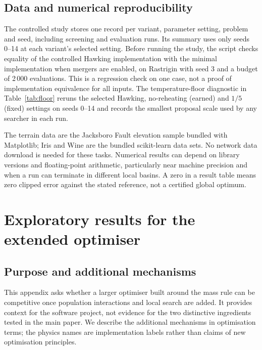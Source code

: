 \documentclass[10pt,a4paper]{article}
\begin{document}
\subsection{Data and numerical reproducibility}

The controlled study stores one record per variant, parameter setting, problem
and seed, including screening and evaluation runs. Its summary uses only seeds
0--14 at each variant's selected setting. Before running the study, the script
checks equality of the controlled Hawking implementation with the minimal
implementation when mergers are enabled, on Rastrigin with seed 3 and a budget
of 2\,000 evaluations. This is a regression check on one case, not a proof of
implementation equivalence for all inputs. The temperature-floor diagnostic in
Table~\ref{tab:floor} reruns the selected Hawking, no-reheating (earned) and
$1/5$ (fixed) settings on seeds 0--14 and records the smallest proposal scale
used by any searcher in each run.

The terrain data are the Jacksboro Fault elevation sample bundled with
Matplotlib; Iris and Wine are the bundled scikit-learn data sets. No network
data download is needed for these tasks. Numerical results can depend on
library versions and floating-point arithmetic, particularly near machine
precision and when a run can terminate in different local basins. A zero in a
result table means zero clipped error against the stated reference, not a
certified global optimum.

\section{Exploratory results for the extended optimiser}
\label{app:full}

\subsection{Purpose and additional mechanisms}

This appendix asks whether a larger optimiser built around the mass rule can
be competitive once population interactions and local search are added. It
provides context for the software project, not evidence for the two distinctive
ingredients tested in the main paper. We describe the additional mechanisms in
optimisation terms; the physics names are implementation labels rather than
claims of new optimisation principles.
\end{document}
